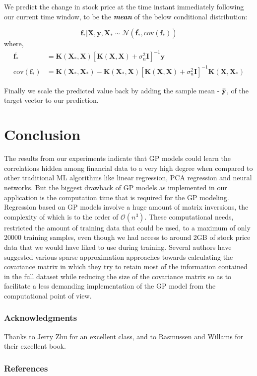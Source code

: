 \documentclass{article} %
\begin{document}
We predict the change in stock price at the time instant immediately following our current time window, to be the \textbf{\textit{mean}} of the below conditional distribution:

\begin{equation}
 \boldsymbol{f_*} | \boldsymbol{X}, \boldsymbol{y}, \boldsymbol{X_*} \sim \mathcal{N}\left(\bar{\boldsymbol{f_*}}, \mbox{cov}(\boldsymbol{f_*})\right)
\end{equation}
where,
\begin{align}
\bar{\boldsymbol{f_*}} &= \boldsymbol{K}\left(\boldsymbol{X_*}, \boldsymbol{X}\right) \left[ \boldsymbol{K}\left(\boldsymbol{X}, \boldsymbol{X}\right) + \sigma_n^2\boldsymbol{I}\right]^{-1} \boldsymbol{y} \\
\mbox{cov}(\boldsymbol{f_*}) &= \boldsymbol{K}\left(\boldsymbol{X_*}, \boldsymbol{X_*}\right) - \boldsymbol{K}\left(\boldsymbol{X_*}, \boldsymbol{X}\right) \left[ \boldsymbol{K}\left(\boldsymbol{X}, \boldsymbol{X}\right) + \sigma_n^2\boldsymbol{I}\right]^{-1} \boldsymbol{K}\left(\boldsymbol{X}, \boldsymbol{X_*}\right)
\end{align}


Finally we scale the predicted value back by adding the sample mean - $\bf\bar{y}$, of the target vector to our prediction.

\section{Conclusion}

The results from our experiments indicate that GP models could learn the correlations hidden among financial data to a very high degree when compared to other traditional ML algorithms like linear regression, PCA regression and neural networks. But the biggest drawback of GP models as implemented in our application is the computation time that is required for the GP modeling. Regression based on GP models involve a huge amount of matrix inversions, the complexity of which is to the order of $\mathcal{O}(n^3)$. These computational needs, restricted the amount of training data that could be used, to a maximum of only 20000 training samples, even though we had access to around 2GB of stock price data that we would have liked to use during training. Several authors have suggested various sparse approximation approaches towards calculating the covariance matrix in which they try to retain most of the information contained in the full dataset while reducing the size of the covariance matrix so as to facilitate a less demanding implementation of the GP model from the computational point of view.

\subsubsection*{Acknowledgments}
Thanks to Jerry Zhu for an excellent class, and to Rasmussen and Willams for their excellent book.


\subsubsection*{References}

\small{
}
\end{document}
